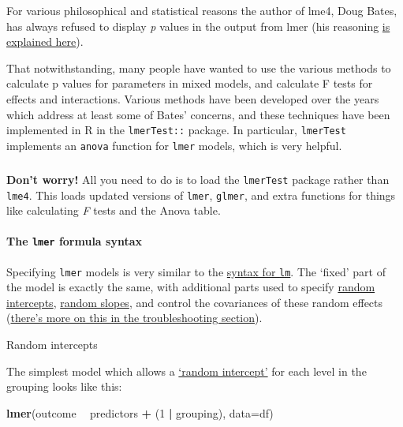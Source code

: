 \documentclass[]{article}
\newenvironment{Shaded}{\begin{snugshade}}{\end{snugshade}}
\newcommand{\DataTypeTok}[1]{\textcolor[rgb]{0.13,0.29,0.53}{#1}}
\newcommand{\DecValTok}[1]{\textcolor[rgb]{0.00,0.00,0.81}{#1}}
\newcommand{\KeywordTok}[1]{\textcolor[rgb]{0.13,0.29,0.53}{\textbf{#1}}}
\newcommand{\NormalTok}[1]{#1}
\newcommand{\OperatorTok}[1]{\textcolor[rgb]{0.81,0.36,0.00}{\textbf{#1}}}
\newcommand{\StringTok}[1]{\textcolor[rgb]{0.31,0.60,0.02}{#1}}
\let\oldparagraph\paragraph
\renewcommand{\paragraph}[1]{\oldparagraph{#1}\mbox{}}
\let\oldsubparagraph\subparagraph
\renewcommand{\subparagraph}[1]{\oldsubparagraph{#1}\mbox{}}
\begin{document}
For various philosophical and statistical reasons the author of lme4, Doug
Bates, has always refused to display \emph{p} values in the output from lmer (his
reasoning
\href{https://stat.ethz.ch/pipermail/r-help/2006-May/094765.html}{is explained here}).

That notwithstanding, many people have wanted to use the various methods to
calculate p values for parameters in mixed models, and calculate F tests for
effects and interactions. Various methods have been developed over the years
which address at least some of Bates' concerns, and these techniques have been
implemented in R in the \texttt{lmerTest::} package. In particular, \texttt{lmerTest}
implements an \texttt{anova} function for \texttt{lmer} models, which is very helpful.

\hypertarget{section-13}{%
\subparagraph{}\label{section-13}}

\textbf{Don't worry!} All you need to do is to load the \texttt{lmerTest} package rather
than \texttt{lme4}. This loads updated versions of \texttt{lmer}, \texttt{glmer}, and extra functions
for things like calculating \emph{F} tests and the Anova table.

\hypertarget{lmer-syntax}{%
\paragraph{\texorpdfstring{The \texttt{lmer} formula syntax}{The lmer formula syntax}}\label{lmer-syntax}}

Specifying \texttt{lmer} models is very similar to the \protect\hyperlink{formulae}{syntax for \texttt{lm}}.
The `fixed' part of the model is exactly the same, with additional parts used to
specify \protect\hyperlink{random-intercepts}{random intercepts},
\protect\hyperlink{random-slopes}{random slopes}, and control the covariances of these random
effects
(\protect\hyperlink{controlling-lmer-covariances}{there's more on this in the troubleshooting section}).

Random intercepts

The simplest model which allows a \protect\hyperlink{random-intercepts}{`random intercept'} for
each level in the grouping looks like this:

\begin{Shaded}
\begin{Highlighting}[]
\KeywordTok{lmer}\NormalTok{(outcome }\OperatorTok{~}\StringTok{ }\NormalTok{predictors }\OperatorTok{+}\StringTok{ }\NormalTok{(}\DecValTok{1} \OperatorTok{|}\StringTok{ }\NormalTok{grouping), }\DataTypeTok{data=}\NormalTok{df)}
\end{Highlighting}
\end{Shaded}
\end{document}
